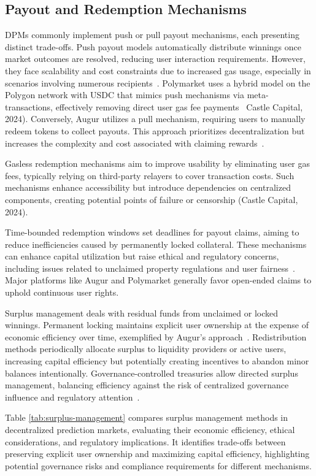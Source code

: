 {\subsection{Payout and Redemption Mechanisms}\label{subsec:payout_redemption}
DPMs commonly implement push or pull payout mechanisms, each presenting distinct trade-offs. Push payout models automatically distribute winnings once market outcomes are resolved, reducing user interaction requirements. However, they face scalability and cost constraints due to increased gas usage, especially in scenarios involving numerous recipients~\cite{ClEsGS21}. Polymarket uses a hybrid model on the Polygon network with USDC that mimics push mechanisms via meta-transactions, effectively removing direct user gas fee payments~\cite{Ma24} Castle Capital, 2024). Conversely, Augur utilizes a pull mechanism, requiring users to manually redeem tokens to collect payouts. This approach prioritizes decentralization but increases the complexity and cost associated with claiming rewards~\cite{AKPWZ15}.

Gasless redemption mechanisms aim to improve usability by eliminating user gas fees, typically relying on third-party relayers to cover transaction costs. Such mechanisms enhance accessibility but introduce dependencies on centralized components, creating potential points of failure or censorship (Castle Capital, 2024).

Time-bounded redemption windows set deadlines for payout claims, aiming to reduce inefficiencies caused by permanently locked collateral. These mechanisms can enhance capital utilization but raise ethical and regulatory concerns, including issues related to unclaimed property regulations and user fairness~\cite{ClEsGS21}. Major platforms like Augur and Polymarket generally favor open-ended claims to uphold continuous user rights.

Surplus management deals with residual funds from unclaimed or locked winnings. Permanent locking maintains explicit user ownership at the expense of economic efficiency over time, exemplified by Augur’s approach~\cite{ClEsGS21}. Redistribution methods periodically allocate surplus to liquidity providers or active users, increasing capital efficiency but potentially creating incentives to abandon minor balances intentionally. Governance-controlled treasuries allow directed surplus management, balancing efficiency against the risk of centralized governance influence and regulatory attention~\cite{BMR17}.

Table \ref{tab:surplus-management} compares surplus management methods in decentralized prediction markets, evaluating their economic efficiency, ethical considerations, and regulatory implications. It identifies trade-offs between preserving explicit user ownership and maximizing capital efficiency, highlighting potential governance risks and compliance requirements for different mechanisms.

}
